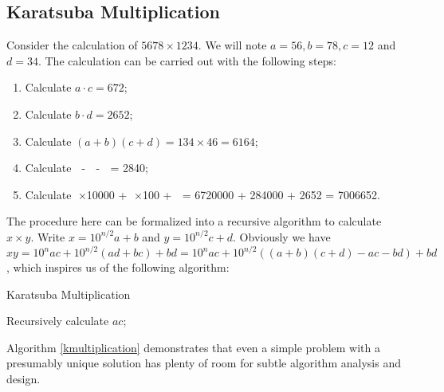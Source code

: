 \subsection{Karatsuba Multiplication}
Consider the calculation of $5678\times1234$. We will note $a = 56, b = 78, c = 12$ and $d = 34$. The calculation can be carried out with the following steps:
\begin{enumerate}
\item Calculate $a\cdot c = 672$;
\item Calculate $b\cdot d = 2652$;
\item Calculate $(a+b)(c+d) = 134\times46 = 6164$;
\item Calculate \textcircled{\raisebox{-.9pt}{3}} - \textcircled{\raisebox{-.9pt}{2}} - \textcircled{\raisebox{-.9pt}{1}} = 2840;
\item Calculate \textcircled{\raisebox{-.9pt}{1}}$\times$10000 + \textcircled{\raisebox{-.9pt}{4}}$\times$100 + \textcircled{\raisebox{-.9pt}{2}} = 6720000 + 284000 + 2652 = 7006652.
\end{enumerate}
The procedure here can be formalized into a recursive algorithm to calculate $x\times y$. Write $x=10^{n/2}a + b$ and $y=10^{n/2}c + d$. Obviously we have $xy=10^nac +\allowbreak 10^{n/2}(ad+bc) +\allowbreak bd =\allowbreak 10^nac + 10^{n/2}((a+b)(c+d)-ac-bd) + bd$, which inspires us of the following algorithm:
\begin{algorithm}[ht]
\caption{Karatsuba Multiplication}\label{kmultiplication}
\begin{algorithmic}[1]\item Recursively calculate $ac$;
\end{algorithmic}
\end{algorithm}

Algorithm \ref{kmultiplication} demonstrates that even a simple problem with a presumably unique solution has plenty of room for subtle algorithm analysis and design. 
